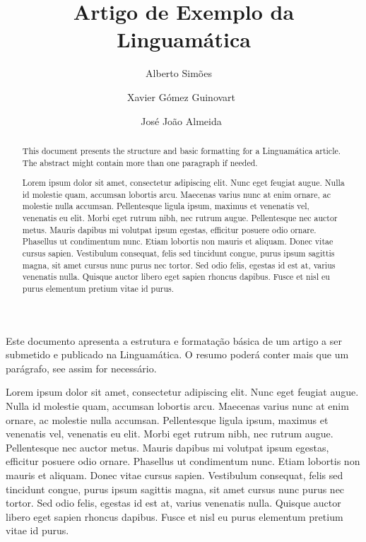 \documentclass[a4paper, twocolumn, 11pt, twoside]{article}
\title{Artigo de Exemplo da Linguamática}
\author{
  Alberto Simões~\email{asimoes@ipca.pt}~\orcid{0000-0001-6961-2660}
  \instituto{2Ai, School of Technology\nl Instituto Politécnico do Cávado e do Ave}   
  \and 
  Xavier Gómez Guinovart~\email{xgg@uvigo.es}
  \instituto{Universidade de Vigo}
  \and
  José João Almeida~\email{jj@di.uminho.pt}
  \instituto{Universidade do Minho}
}
\begin{document}
\maketitle

\begin{resumo}
  Este documento apresenta a estrutura e formatação básica de um artigo a ser submetido e publicado na Linguamática. O resumo poderá conter mais que um parágrafo, see assim for necessário. 

   Lorem ipsum dolor sit amet, consectetur adipiscing elit. Nunc eget feugiat augue. Nulla id molestie quam, accumsan lobortis arcu. Maecenas varius nunc at enim ornare, ac molestie nulla accumsan. Pellentesque ligula ipsum, maximus et venenatis vel, venenatis eu elit. Morbi eget rutrum nibh, nec rutrum augue. Pellentesque nec auctor metus. Mauris dapibus mi volutpat ipsum egestas, efficitur posuere odio ornare. Phasellus ut condimentum nunc. Etiam lobortis non mauris et aliquam. Donec vitae cursus sapien. Vestibulum consequat, felis sed tincidunt congue, purus ipsum sagittis magna, sit amet cursus nunc purus nec tortor. Sed odio felis, egestas id est at, varius venenatis nulla. Quisque auctor libero eget sapien rhoncus dapibus. Fusce et nisl eu purus elementum pretium vitae id purus. 
\end{resumo}



\begin{abstract}
  This document presents the structure and basic formatting for a Linguamática article.
   The abstract might contain more than one paragraph if needed.

   Lorem ipsum dolor sit amet, consectetur adipiscing elit. Nunc eget feugiat augue. Nulla id molestie quam, accumsan lobortis arcu. Maecenas varius nunc at enim ornare, ac molestie nulla accumsan. Pellentesque ligula ipsum, maximus et venenatis vel, venenatis eu elit. Morbi eget rutrum nibh, nec rutrum augue. Pellentesque nec auctor metus. Mauris dapibus mi volutpat ipsum egestas, efficitur posuere odio ornare. Phasellus ut condimentum nunc. Etiam lobortis non mauris et aliquam. Donec vitae cursus sapien. Vestibulum consequat, felis sed tincidunt congue, purus ipsum sagittis magna, sit amet cursus nunc purus nec tortor. Sed odio felis, egestas id est at, varius venenatis nulla. Quisque auctor libero eget sapien rhoncus dapibus. Fusce et nisl eu purus elementum pretium vitae id purus. 
\end{abstract}
\end{document}
